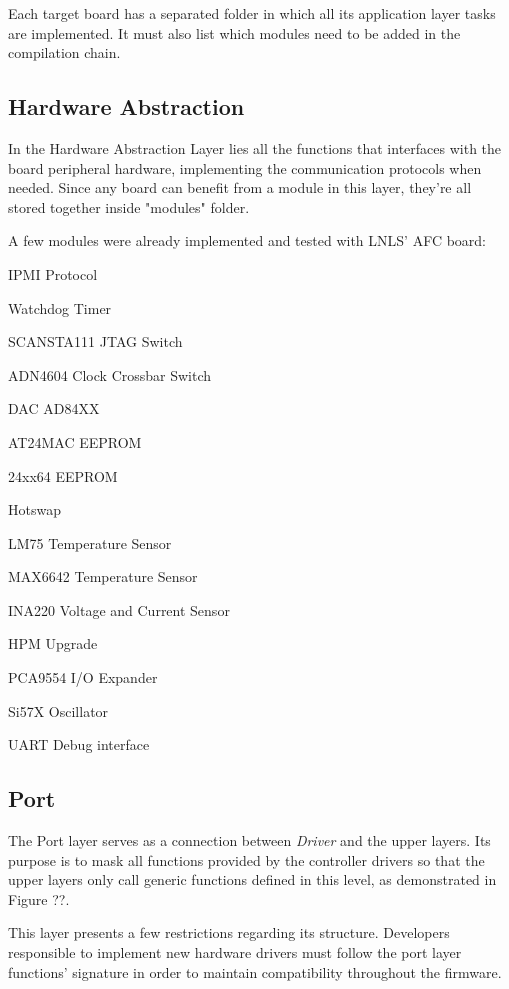 \documentclass[a4paper,
              ]{jacow}
\begin{document}
Each target board has a separated folder in which all its application layer tasks are implemented. It must also list which modules need to be added in the compilation chain.

\subsection{Hardware Abstraction}
In the Hardware Abstraction Layer lies all the functions that interfaces with the board peripheral hardware, implementing the communication protocols when needed. Since any board can benefit from a module in this layer, they're all stored together inside "modules" folder.

A few modules were already implemented and tested with LNLS' AFC board:
\begin{Itemize}

\item IPMI Protocol
\item Watchdog Timer
\item SCANSTA111 JTAG Switch
\item ADN4604 Clock Crossbar Switch
\item DAC AD84XX
\item AT24MAC EEPROM
\item 24xx64 EEPROM
\item Hotswap
\item LM75 Temperature Sensor
\item MAX6642 Temperature Sensor
\item INA220 Voltage and Current Sensor
\item HPM Upgrade
\item PCA9554 I/O Expander
\item Si57X Oscillator
\item UART Debug interface

\end{Itemize}

\subsection{Port}
The Port layer serves as a connection between \emph{Driver} and the upper layers.
Its purpose is to mask all functions provided by the controller drivers so that the upper layers only call generic functions defined in this level, as demonstrated in Figure ??.


This layer presents a few restrictions regarding its structure. Developers responsible to implement new hardware drivers must follow the port layer functions' signature in order to maintain compatibility throughout the firmware.
\end{document}
